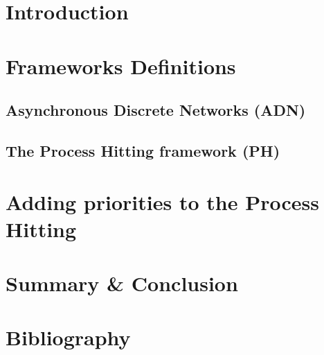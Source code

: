 \documentclass[fleqn,8pt,t]{beamer}
\begin{document}
\section{Introduction}


\section{Frameworks Definitions}
\subsection{Asynchronous Discrete Networks (ADN)}

\subsection{The Process Hitting framework (PH)}
%
%
%
%

\section{Adding priorities to the Process Hitting}
%
%

\section{Summary \& Conclusion}


\appendix
\section[x]{Bibliography}

%
\end{document}
